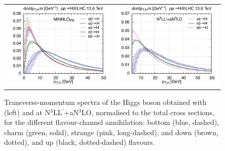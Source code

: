 \documentclass[11pt,a4paper]{article}
\begin{document}
\begin{figure}[t!]
\begin{center}
\begin{tabular}{cc}
	\includegraphics[width=.45\textwidth, page=1]{plots/5fs/light/ptHzoom_qqH.pdf}&
	\includegraphics[width=.45\textwidth, page=1]{plots/5fs/light/ptHzoom_qqHres.pdf}
\end{tabular}
\vspace*{1ex}
\caption{Transverse-momentum spectra of the Higgs boson obtained with \minnlo{} (left) and at N$^3$LL$^{\prime}$+aN$^3$LO, normalised to the total cross sections, for the different flavour-channel annihilation: bottom (blue, dashed), charm (green, solid), strange (pink, long-dashed), and down (brown, dotted), and  up (black, dotted-dashed) flavours.
\label{fig:lightpTHzoom}}
\end{center}
\end{figure}
\end{document}
